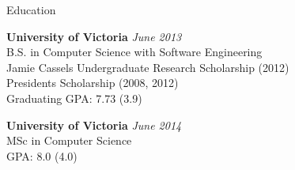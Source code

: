 \documentclass{resume} %
\begin{document}

\begin{rSection}{Education}

{\bf University of Victoria} \hfill {\em June 2013} \\
B.S. in Computer Science with Software Engineering \\
Jamie Cassels Undergraduate Research Scholarship (2012) \\
Presidents Scholarship (2008, 2012) \\
Graduating GPA: 7.73 (3.9)

{\bf University of Victoria} \hfill {\em June 2014} \\
MSc in Computer Science\\
GPA: 8.0 (4.0)

\end{rSection}

\end{document}

